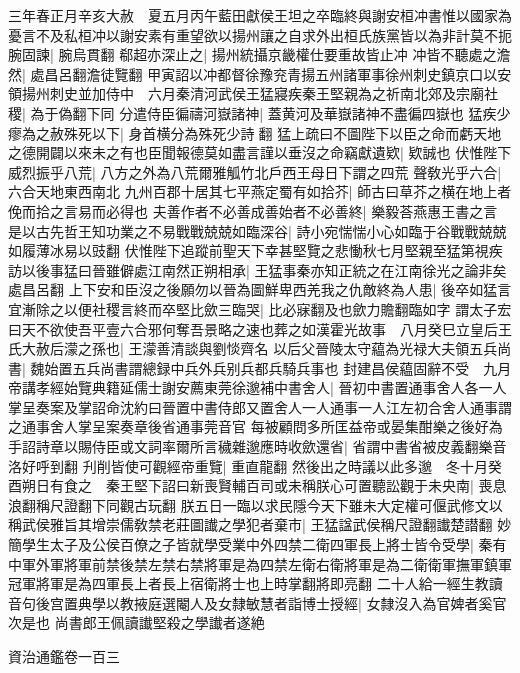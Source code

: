 三年春正月辛亥大赦　夏五月丙午藍田獻侯王坦之卒臨終與謝安桓冲書惟以國家為憂言不及私桓冲以謝安素有重望欲以揚州讓之自求外出桓氏族黨皆以為非計莫不扼腕固諫|{
	腕烏貫翻}
郗超亦深止之|{
	揚州統攝京畿權仕要重故皆止冲}
冲皆不聽處之澹然|{
	處昌呂翻澹徒覽翻}
甲寅詔以冲都督徐豫兖青揚五州諸軍事徐州刺史鎮京口以安領揚州刺史並加侍中　六月秦清河武侯王猛寢疾秦王堅親為之祈南北郊及宗廟社稷|{
	為于偽翻下同}
分遣侍臣徧禱河嶽諸神|{
	蓋黄河及華嶽諸神不盡徧四嶽也}
猛疾少瘳為之赦殊死以下|{
	身首横分為殊死少詩翻}
猛上疏曰不圖陛下以臣之命而虧天地之德開闢以來未之有也臣聞報德莫如盡言謹以垂沒之命竊獻遺欵|{
	欵誠也}
伏惟陛下威烈振乎八荒|{
	八方之外為八荒爾雅觚竹北戶西王母日下謂之四荒}
聲敎光乎六合|{
	六合天地東西南北}
九州百郡十居其七平燕定蜀有如拾芥|{
	師古曰草芥之横在地上者俛而拾之言易而必得也}
夫善作者不必善成善始者不必善終|{
	樂毅荅燕惠王書之言}
是以古先哲王知功業之不易戰戰兢兢如臨深谷|{
	詩小宛惴惴小心如臨于谷戰戰兢兢如履薄冰易以豉翻}
伏惟陛下追蹤前聖天下幸甚堅覽之悲慟秋七月堅親至猛第視疾訪以後事猛曰晉雖僻處江南然正朔相承|{
	王猛事秦亦知正統之在江南徐光之論非矣處昌呂翻}
上下安和臣沒之後願勿以晉為圖鮮卑西羌我之仇敵終為人患|{
	後卒如猛言}
宜漸除之以便社稷言終而卒堅比歛三臨哭|{
	比必寐翻及也歛力贍翻臨如字}
謂太子宏曰天不欲使吾平壹六合邪何奪吾景略之速也葬之如漢霍光故事　八月癸巳立皇后王氏大赦后濛之孫也|{
	王濛善清談與劉惔齊名}
以后父晉陵太守藴為光禄大夫領五兵尚書|{
	魏始置五兵尚書謂總録中兵外兵别兵都兵騎兵事也}
封建昌侯藴固辭不受　九月帝講孝經始覽典籍延儒士謝安薦東莞徐邈補中書舍人|{
	晉初中書置通事舍人各一人掌呈奏案及掌詔命沈約曰晉置中書侍郎又置舍人一人通事一人江左初合舍人通事謂之通事舍人掌呈案奏章後省通事莞音官}
每被顧問多所匡益帝或晏集酣樂之後好為手詔詩章以賜侍臣或文詞率爾所言穢雜邈應時收歛還省|{
	省謂中書省被皮義翻樂音洛好呼到翻}
刋削皆使可觀經帝重覽|{
	重直龍翻}
然後出之時議以此多邈　冬十月癸酉朔日有食之　秦王堅下詔曰新喪賢輔百司或未稱朕心可置聽訟觀于未央南|{
	喪息浪翻稱尺證翻下同觀古玩翻}
朕五日一臨以求民隱今天下雖未大定權可偃武修文以稱武侯雅旨其增崇儒敎禁老莊圖䜟之學犯者棄市|{
	王猛諡武侯稱尺證翻䜟楚譛翻}
妙簡學生太子及公侯百僚之子皆就學受業中外四禁二衛四軍長上將士皆令受學|{
	秦有中軍外軍將軍前禁後禁左禁右禁將軍是為四禁左衛右衛將軍是為二衛衛軍撫軍鎮軍冠軍將軍是為四軍長上者長上宿衛將士也上時掌翻將即亮翻}
二十人給一經生教讀音句後宫置典學以教掖庭選閹人及女隸敏慧者詣博士授經|{
	女隸沒入為官婢者奚官次是也}
尚書郎王佩讀䜟堅殺之學䜟者遂絶

資治通鑑卷一百三
